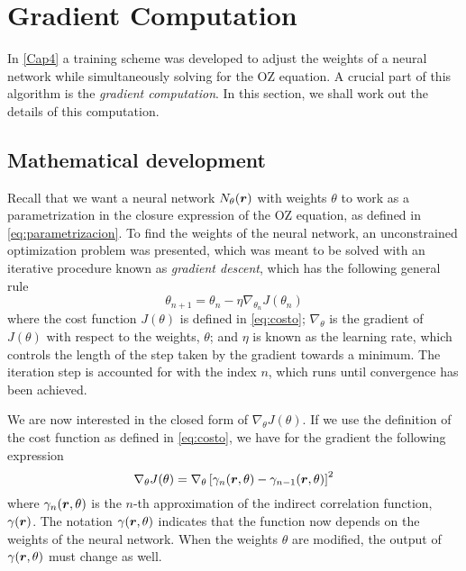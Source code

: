 \chapter{Gradient Computation}
\label{AppendixA}

In \autoref{Cap4} a training scheme was developed to adjust the weights of a neural
network while simultaneously solving for the OZ equation. A crucial part of
this algorithm is the \emph{gradient computation}. In this section, we shall work
out the details of this computation.

\section{Mathematical development}
Recall that we want a neural network $N_{\theta}(\bm{r})$ with weights $\theta$ to work as a
parametrization in the closure expression of the OZ equation, as defined in
\autoref{eq:parametrizacion}. To find the weights of the neural network, an
unconstrained optimization problem was presented, which was meant to be solved with
an iterative procedure known as \emph{gradient descent}, which has the following
general rule
\[
\theta_{n+1} = \theta_{n} - \eta \nabla_{\theta_{n}} J(\theta_{n})
\]
where the cost function $J(\theta)$ is defined in \autoref{eq:costo}; $\nabla_{\theta}$
is the gradient of $J(\theta)$ with respect to the weights, $\theta$; and $\eta$ is known
as the learning rate, which controls the length of the step taken by the gradient
towards a minimum. The iteration step is accounted for with the index $n$, which runs until
convergence has been achieved.

We are now interested in the closed form of $\nabla_{\theta} J(\theta)$. If we use the
definition of the cost function as defined in \autoref{eq:costo}, we have for the
gradient the following expression
\begin{equation}
    \nabla_{\theta} J(\theta) = \nabla_{\theta} \left[\gamma_{n}(\bm{r}, \theta) - \gamma_{n-1}(\bm{r}, \theta) \right]^2
    \label{eq:grad1}
\end{equation}
where $\gamma_{n}(\bm{r}, \theta)$ is the $n$-th approximation of the indirect
correlation function, $\gamma(\bm{r})$.
The notation $\gamma(\bm{r}, \theta)$ indicates that the function now depends
on the weights of the neural network. When the weights $\theta$ are modified, the output of
$\gamma(\bm{r}, \theta)$ must change as well.

